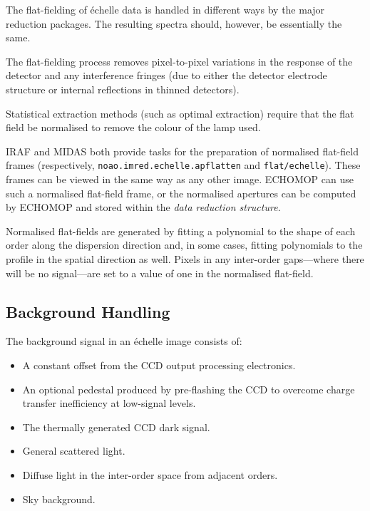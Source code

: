\documentclass[twoside,11pt]{article}
\newcommand{\xref}[3]{#1}
\newcommand{\xlabel}[1]{}
\newcommand{\sgspec}[2]{#1}
\newcommand{\sgspec}[2]{#2}
\begin{document}
The flat-fielding of \'{e}chelle data is handled in different ways by
the major reduction packages.  The resulting spectra should, however, be
essentially the same.

The flat-fielding process removes pixel-to-pixel variations in the
response of the detector and any interference fringes (due to either the
detector electrode structure or internal reflections in thinned
detectors).

Statistical extraction methods (such as optimal extraction) require
that the flat field be normalised to remove the colour of the lamp used.

IRAF and MIDAS both provide tasks for the preparation of normalised
flat-field frames (respectively, {\tt noao.imred.echelle.apflatten} and
{\tt{flat/echelle}})\@.  These frames can be viewed in the same
way as any other image.  \xref{ECHOMOP}{sun152}{} can use such a
normalised flat-field frame, or the normalised apertures can be computed
by ECHOMOP and stored within the {\sl data reduction structure}\@.

Normalised flat-fields are generated by fitting a polynomial to the
shape of each order along the dispersion direction and, in some cases,
fitting polynomials to the profile in the spatial direction as well.
Pixels in any inter-order gaps\sgspec{---}{ - }where there will be no
signal\sgspec{---}{ - }are set
to a value of one in the normalised flat-field.


\subsection{\label{se_background_handling}\xlabel{background_handling}Background
            Handling}

The background signal in an \'{e}chelle image consists of:

\begin{itemize}

\item A constant offset from the CCD output processing electronics.

\item An optional pedestal produced by pre-flashing the CCD to overcome
      charge transfer inefficiency at low-signal levels.

\item The thermally generated CCD dark signal.

\item General scattered light.

\item Diffuse light in the inter-order space from adjacent orders.

\item Sky background.

\end{itemize}
\end{document}

